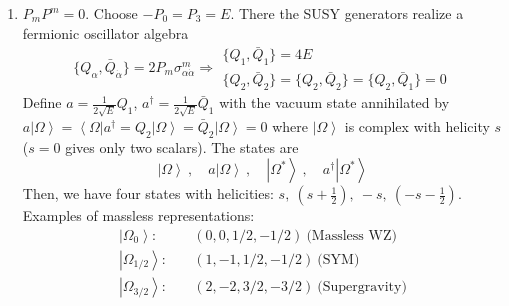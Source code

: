 \documentclass[a4paper,12pt]{article}
\numberwithin{equation}{section}
\numberwithin{exe}{section}
\newcommand{\Qb}{{\bar Q}}
\newcommand{\vac}{{\left|\Omega\right>}}
\renewcommand{\a}{{\alpha}}
\newcommand{\ad}{{\dot\alpha}}
\newcommand{\s}{{\sigma}}
\begin{document}
\begin{enumerate}
	\item $P_m P^m = 0$. Choose $-P_0 = P_3 = E$. There the SUSY generators realize a fermionic oscillator algebra
		\begin{equation}
		\{Q_\a, \Qb_\ad\} = 2P_m\s^m_{\a\ad} \Rightarrow
			\begin{array}{l}
			\{Q_1,\Qb_1\} = 4E \\
			\{Q_2, \Qb_2\} = \{Q_2,\Qb_2\} = \{Q_2, \Qb_1\}= 0
			\end{array}
		\end{equation}
	Define $a=\frac{1}{2\sqrt E}Q_1$, $a^\dagger = \frac{1}{2\sqrt E} \Qb_1$ with the vacuum state annihilated by $a\vac = \left<\Omega\right| a^\dagger = Q_2\vac = \Qb_2\vac =0$ where $\vac$ is complex with helicity $s$ ($s=0$ gives only two scalars). The states are
		\begin{equation}
		\vac\ ,\quad a\vac\ ,\quad \left|\Omega^*\right>\ ,\quad a^\dagger\left|\Omega^*\right>
		\end{equation}
	Then, we have four states with helicities: $s,\ (s+\frac12),\ -s,\ (-s-\frac12)$.
	Examples of massless representations:
	\begin{equation}
		\begin{aligned}
		\left|\Omega_0\right>:&\quad (0,0,1/2,-1/2)\ \text{(Massless WZ)} \\
		\left|\Omega_{1/2}\right>:&\quad (1,-1,1/2,-1/2)\ \text{(SYM)} \\
		\left|\Omega_{3/2}\right>:&\quad (2,-2, 3/2, -3/2)\ \text{(Supergravity)}
		\end{aligned}
	\end{equation}
	\end{enumerate}
\end{document}
